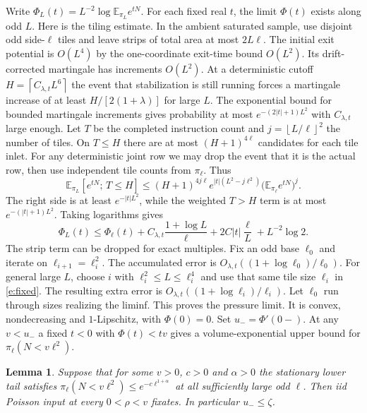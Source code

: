 \documentclass[11pt]{amsart}
\newtheorem{lemma}[theorem]{Lemma}
\newcommand{\E}{\mathbb E}
\newcommand{\1}{\mathbf 1}
\newcommand{\floor}[1]{\left\lfloor #1\right\rfloor}
\newcommand{\ceil}[1]{\left\lceil #1\right\rceil}
\begin{document}
Write \(\Phi_L(t)=L^{-2}\log\E_{\pi_L}e^{tN}\). For each fixed real \(t\), the limit \(\Phi(t)\) exists along odd \(L\). Here is the tiling estimate. In the ambient saturated sample, use disjoint odd side-\(\ell\) tiles and leave strips of total area at most \(2L\ell\). The initial exit potential is \(O(L^4)\) by the one-coordinate exit-time bound \(O(L^2)\). Its drift-corrected martingale has increments \(O(L^2)\). At a deterministic cutoff \(H=\ceil{C_{\lambda,t} L^6}\) the event that stabilization is still running forces a martingale increase of at least \(H/[2(1+\lambda)]\) for large \(L\). The exponential bound for bounded martingale increments gives probability at most \(e^{-(2|t|+1)L^2}\) with \(C_{\lambda,t}\) large enough. Let \(T\) be the completed instruction count and \(j=\floor{L/\ell}^2\) the number of tiles. On \(T\le H\) there are at most \((H+1)^{4\ell}\) candidates for each tile inlet. For any deterministic joint row we may drop the event that it is the actual row, then use independent tile counts from \(\pi_\ell\). Thus
\[
 \E_{\pi_L}[e^{tN};\,T\le H]
 \le (H+1)^{4j\ell}e^{|t|(L^2-j\ell^2)}
       \big(\E_{\pi_\ell} e^{tN}\big)^j .
\]
The right side is at least \(e^{-|t|L^2}\), while the weighted \(T>H\) term is at most \(e^{-(|t|+1)L^2}\). Taking logarithms gives
\begin{equation}\label{e:fixed}
 \Phi_L(t)\le\Phi_\ell(t)
   +C_{\lambda,t}\frac{1+\log L}{\ell}
   +2C|t|\frac{\ell}{L}+L^{-2}\log2 .
\end{equation}
The strip term can be dropped for exact multiples. Fix an odd base \(\ell_0\) and iterate on \(\ell_{i+1}=\ell_i^2\). The accumulated error is \(O_{\lambda,t}((1+\log\ell_0)/\ell_0)\). For general large \(L\), choose \(i\) with \(\ell_i^2\le L\le\ell_i^4\) and use that same tile size \(\ell_i\) in \eqref{e:fixed}. The resulting extra error is \(O_{\lambda,t}((1+\log\ell_i)/\ell_i)\). Let \(\ell_0\) run through sizes realizing the liminf. This proves the pressure limit. It is convex, nondecreasing and \(1\)-Lipschitz, with \(\Phi(0)=0\). Set \(u_-=\Phi'(0-)\). At any \(v<u_-\) a fixed \(t<0\) with \(\Phi(t)<tv\) gives a volume-exponential upper bound for \(\pi_\ell(N<v\ell^2)\).

\begin{lemma}\label{l:fix}
 Suppose that for some \(v>0\), \(c>0\) and \(\alpha>0\) the stationary lower tail satisfies \(\pi_\ell(N<v\ell^2)\le e^{-c\ell^{1+\alpha}}\) at all sufficiently large odd \(\ell\). Then iid Poisson input at every \(0<\rho<v\) fixates. In particular \(u_-\le\zeta\).
\end{lemma}
\end{document}
